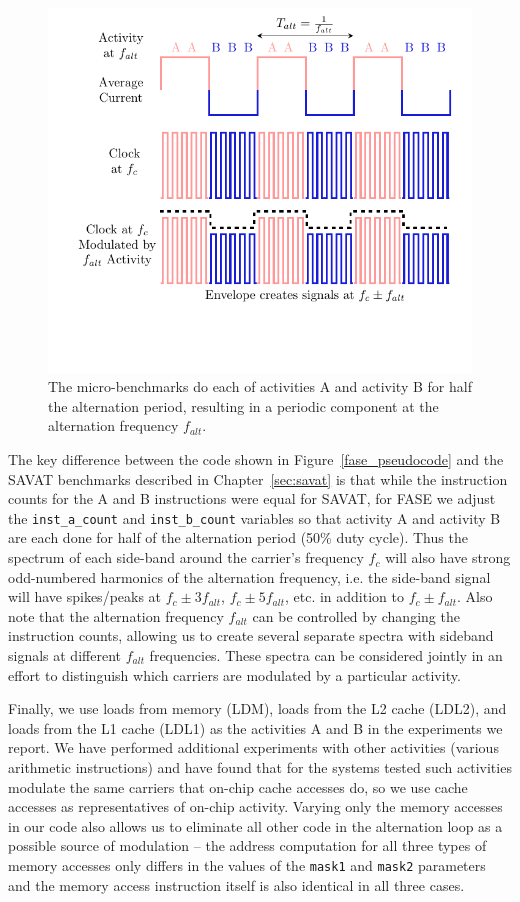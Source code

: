 \begin{figure}[tbh]
  \centering
  \includegraphics[width=5in]{../fase/Drawing/alt_freq.pdf}
  \caption{The micro-benchmarks do each of activities A and activity B for half the alternation period, resulting in a periodic component at the alternation frequency $f_{alt}$.}
  \label{fig:alt_freq}
\end{figure}

The key difference between the code shown in Figure~\ref{fase_pseudocode} and the SAVAT benchmarks described in Chapter~\ref{sec:savat} is that while the instruction counts for the A and B instructions were equal for SAVAT, for FASE we adjust the \texttt{inst\_a\_count} and \texttt{inst\_b\_count} variables so that activity A and activity B are each done for half of the alternation period (50\% duty cycle). Thus the spectrum of each side-band around the carrier's frequency $f_c$ will also have strong odd-numbered harmonics of the alternation frequency, i.e. the side-band signal will have spikes/peaks at $f_c \pm 3f_{alt}$, $f_c \pm 5f_{alt}$, etc. in addition to $f_c \pm f_{alt}$. Also note that the alternation frequency $f_{alt}$ can be controlled by changing the instruction counts, allowing us to create several separate spectra with sideband signals at different $f_{alt}$ frequencies. These spectra can be considered jointly in an effort to distinguish which carriers are modulated by a particular activity.

Finally, we use loads from memory (LDM), loads from the L2 cache (LDL2), and loads from the L1 cache (LDL1) as the activities A and B in the experiments we report. We have performed additional experiments with other activities (various arithmetic instructions) and have found that for the systems tested such activities modulate the same carriers that on-chip cache accesses do, so we use cache accesses as representatives of on-chip activity. Varying only the memory accesses in our code also allows us to eliminate all other code in the alternation loop as a possible source of modulation -- the address computation for all three types of memory accesses only differs in the values of the \texttt{mask1} and \texttt{mask2} parameters and the memory access instruction itself is also identical in all three cases.

